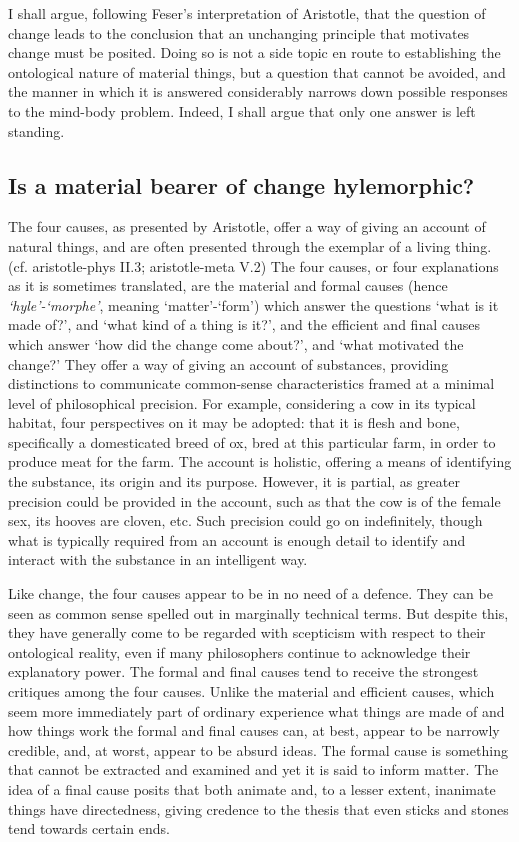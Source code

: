 I shall argue, following Feser's interpretation of Aristotle, that the question of change leads to the conclusion that an unchanging principle that motivates change must be posited. Doing so is not a side topic en route to establishing the ontological nature of material things, but a question that cannot be avoided, and the manner in which it is answered considerably narrows down possible responses to the mind-body problem. Indeed, I shall argue that only one answer is left standing.

\subsection{Is a material bearer of change hylemorphic?}

The four causes, as presented by Aristotle, offer a way of giving an account of natural things, and are often presented through the exemplar of a living thing.
(cf. \acrshort{aristotle-phys} II.3; \acrshort{aristotle-meta} V.2)
The four causes, or four explanations as it is sometimes translated, are the material and formal causes (hence \emph{`hyle'-`morphe'}, meaning `matter'-`form') which answer the questions `what is it made of?', and `what kind of a thing is it?', and the efficient and final causes which answer `how did the change come about?', and `what motivated the change?' They offer a way of giving an account of substances, providing distinctions to communicate common-sense characteristics framed at a minimal level of philosophical precision. For example, considering a cow in its typical habitat, four perspectives on it may be adopted: that it is flesh and bone, specifically a domesticated breed of ox, bred at this particular farm, in order to produce meat for the farm. The account is holistic, offering a means of identifying the substance, its origin and its purpose. However, it is partial, as greater precision could be provided in the account, such as that the cow is of the female sex, its hooves are cloven, etc. Such precision could go on indefinitely, though what is typically required from an account is enough detail to identify and interact with the substance in an intelligent way.

Like change, the four causes appear to be in no need of a defence. They can be seen as common sense spelled out in marginally technical terms.
But despite this, they have generally come to be regarded with scepticism with respect to their ontological reality, even if many philosophers continue to acknowledge their explanatory power.
\parencite[][]{Robinson2018-talk}
The formal and final causes tend to receive the strongest critiques among the four causes. Unlike the material and efficient causes, which seem more immediately part of ordinary experience {\textemdash}what things are made of and how things work{\textemdash} the formal and final causes can, at best, appear to be narrowly credible, and, at worst, appear to be absurd ideas. The formal cause is something that cannot be extracted and examined and yet it is said to inform matter. The idea of a final cause posits that both animate and, to a lesser extent, inanimate things have directedness, giving credence to the thesis that even sticks and stones tend towards certain ends.

